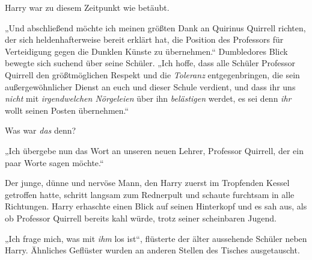 Harry war zu diesem Zeitpunkt wie betäubt.

„Und abschließend möchte ich meinen größten Dank an Quirinus Quirrell richten, der sich heldenhafterweise bereit erklärt hat, die Position des Professors für Verteidigung gegen die Dunklen Künste zu übernehmen.“ Dumbledores Blick bewegte sich suchend über seine Schüler. „Ich hoffe, dass alle Schüler Professor Quirrell den größtmöglichen Respekt und die \emph{Toleranz} entgegenbringen, die sein außergewöhnlicher Dienst an euch und dieser Schule verdient, und dass ihr uns \emph{nicht} mit \emph{irgendwelchen Nörgeleien} über ihn \emph{belästigen} werdet, es sei denn \emph{ihr} wollt seinen Posten übernehmen.“

Was war \emph{das} denn?

„Ich übergebe nun das Wort an unseren neuen Lehrer, Professor Quirrell, der ein paar Worte sagen möchte.“

Der junge, dünne und nervöse Mann, den Harry zuerst im Tropfenden Kessel getroffen hatte, schritt langsam zum Rednerpult und schaute furchtsam in alle Richtungen. Harry erhaschte einen Blick auf seinen Hinterkopf und es sah aus, als ob Professor Quirrell bereits kahl würde, trotz seiner scheinbaren Jugend.

„Ich frage mich, was mit \emph{ihm} los ist“, flüsterte der älter aussehende Schüler neben Harry. Ähnliches Geflüster wurden an anderen Stellen des Tisches ausgetauscht.


